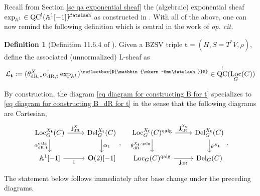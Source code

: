 \documentclass[11pt, a4paper]{amsart}
\numberwithin{equation}{section}
\theoremstyle{definition}
\newtheorem{definition}[theorem]{Definition}
\theoremstyle{remark}
\DeclareMathOperator{\Loc}{Loc}
\DeclareMathOperator{\dR}{dR}
\DeclareMathOperator{\Del}{Del}
\DeclareMathOperator{\QC}{QC}
\newcommand{\shear}{{\mathbin{\mkern-6mu\fatslash}}}
\DeclareRobustCommand{\unshear}{\text{\reflectbox{$\shear$}}}
\DeclareMathOperator{\qalg}{\mathrm{qalg}}
\newcommand{\Ll}{\mathcal{L}}
\newcommand{\OO}{\mathbf{O}}
\renewcommand{\AA}{\mathbb{A}}
\begin{document}
Recall from Section \ref{sc qa exponential sheaf} the (algebraic) exponential sheaf $\exp_{\AA^1} \in \QC^!(\AA^1[-1])^{\shear}$ as constructed in \cite{BZSV}. 
With all of the above, one can now remind the following definition which is central in the work of {\it op. cit.}

\begin{definition}[Definition 11.6.4 of \cite{BZSV}]
Given a BZSV triple $\mathbf{t} = (H, S = T^*V, \rho)$, define the associated (unnormalized) L-sheaf as 
\[
\Ll_{\mathbf{t}} := (\theta_{\dR, *}^X\alpha_{\dR, \mathbf{t}}^!\exp_{\AA^1})^\unshear \in \QC^!(\Loc_G(C))
\]
\end{definition}



By construction, the diagram \eqref{eq diagram for constructing B for t} specializes to \eqref{eq diagram for constructing B_dR for t} in the sense that the following diagrams are Cartesian,
\[
\begin{tikzcd}
	{\Loc_G^{X_\mathbf{t}}(C)} & {\Del_G^{X_\mathbf{t}}(C)} \\
	{\AA^1[-1]} & {\OO(2)[-1]}
	\arrow[from=1-1, to=1-2, "\mathbf{j}^X_{\dR}"]
	\arrow[from=1-1, to=2-1, "\alpha_{\dR, \mathbf{t}}^{\qalg}"']
	\arrow[from=1-2, to=2-2, "\boldsymbol{\alpha}_{\mathbf{t}}"]
	\arrow[from=2-1, to=2-2, "\mathbf{i}"']
\end{tikzcd}, \quad \begin{tikzcd}
	{\Loc_G^{X_\mathbf{t}}(C)^{\qalg}} & {\Del_G^{X_\mathbf{t}}(C)} \\
	{\Loc_G(C)^{\qalg}} & {\Del_G(C)}
	\arrow[from=1-1, to=1-2, "\mathbf{j}^{X_{\mathbf{t}}}_{\dR}"]
	\arrow[from=1-1, to=2-1, "\theta_{\dR}^{X_{\mathbf{t}},\qalg}"']
	\arrow[from=1-2, to=2-2, "\theta^{X_{\mathbf{t}}}"]
	\arrow[from=2-1, to=2-2, "\mathbf{j}_{\dR}"']
\end{tikzcd}.
\]

The statement below follows immediately after base change under the preceding diagrams.
\end{document}
